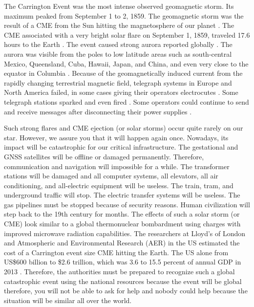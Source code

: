 \documentclass[sn-aps]{sn-jnl}%
\begin{document}
The Carrington Event was the most intense observed geomagnetic storm. Its maximum peaked from September 1 to 2, 1859. The geomagnetic storm was the result of a CME from the Sun hitting the magnetosphere of our planet \cite{tsurutani03:_septem}. The CME associated with a very bright solar flare on September 1, 1859, traveled 17.6 hours to the Earth \cite{odenwald08:_bracin}.  The event caused strong aurora reported globally \cite{kimball60:_study_auror}. The aurora was visible from the poles to low latitude areas such as south-central Mexico, Queensland, Cuba, Hawaii, Japan, and China, and even very close to the equator in Columbia \cite{hayakawa18:_low_auror_extrem_space_weath_event,gonzalez-esparza18:_obser_low_latit_red_auror,green06:_durat,hayakawa16:_east_asian_carrin,moreno16:_colom}. Because of the geomagnetically induced current from the rapidly changing terrestrial magnetic field, telegraph systems in Europe and North America failed, in some cases giving their operators electrocutes \cite{societal08:_sever_space_weath_event}. Some telegraph stations sparked and even fired \cite{odenwald02:_cycle}. Some operators could continue to send and receive messages after disconnecting their power supplies \cite{carlowicz02:_storm_sun}.

Such strong flares and CME ejection (or solar storms) occur quite rarely on our star. However, we assure you that it will happen again once. Nowadays, its impact will be catastrophic for our critical infrastructure. The gestational and GNSS satellites will be offline or damaged permanently. Therefore, communication and navigation will impossible for a while. The transformer stations will be damaged and all computer systems, all elevators, all air conditioning, and all-electric equipment will be useless. The train, tram, and underground traffic will stop. The electric transfer systems will be useless. The gas pipelines must be stopped because of security reasons. Human civilization will step back to the 19th century for months. The effects of such a solar storm (or CME) look similar to a global thermonuclear bombardment using charges with improved microwave radiation capabilities. The researchers at Lloyd's of London and Atmospheric and Environmental Research (AER) in the US estimated the cost of a Carrington event size CME hitting the Earth. The US alone from US\$600 billion to \$2.6 trillion, which was 3.6 to 15.5 percent of annual GDP in 2013 \cite{london13:_solar_storm_risk_north_americ_elect_grid}.  Therefore, the authorities must be prepared to recognize such a global catastrophic event using the national resources because the event will be global therefore, you will not be able to ask for help and nobody could help because the situation will be similar all over the world. 
\end{document}
